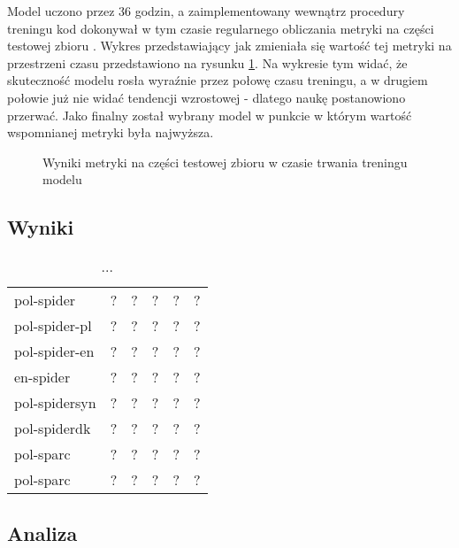 Model uczono przez 36 godzin, a zaimplementowany wewnątrz procedury treningu kod dokonywał w tym czasie regularnego obliczania metryki  na części testowej zbioru . Wykres przedstawiający jak zmieniała się wartość tej metryki na przestrzeni czasu przedstawiono na rysunku \ref{plot:bridge-accuracy}. Na wykresie tym widać, że skuteczność modelu rosła wyraźnie przez połowę czasu treningu, a w drugiem połowie już nie widać tendencji wzrostowej - dlatego naukę postanowiono przerwać. Jako finalny został wybrany model w punkcie w którym wartość wspomnianej metryki była najwyższa.

\begin{figure}[ht!]
  \begin{center}
    \caption{Wyniki metryki  na części testowej zbioru  w czasie trwania treningu modelu}
    \label{plot:bridge-accuracy}
  \end{center}
\end{figure}

\subsection{Wyniki}

\lipsum[1][1-7]

\begin{table}[H]
    \centering
    \begin{tabular}{|l|R{0.10\textwidth}|R{0.10\textwidth}|R{0.10\textwidth}|R{0.10\textwidth}|R{0.10\textwidth}|}
        \hline
         &  &  &  &  &  \\
        \hline
        pol-spider & ? & ? & ? & ? & ? \\
        pol-spider-pl & ? & ? & ? & ? & ? \\
        pol-spider-en & ? & ? & ? & ? & ? \\
        en-spider & ? & ? & ? & ? & ? \\
        \hline
        pol-spidersyn & ? & ? & ? & ? & ? \\
        pol-spiderdk & ? & ? & ? & ? & ? \\
        pol-sparc & ? & ? & ? & ? & ? \\
        pol-sparc & ? & ? & ? & ? & ? \\
        \hline
    \end{tabular}
    \caption{...}
    \label{tab:bridge-difficulty}
\end{table}

\subsection{Analiza}

\lipsum[1-4]

